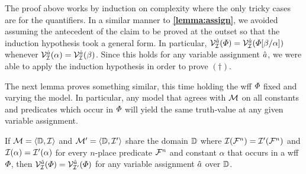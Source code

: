 The proof above works by induction on complexity where the only tricky cases are for the quantifiers.
In a similar manner to \textbf{\ref{lemma:assign}}, we avoided assuming the antecedent of the claim to be proved at the outset so that the induction hypothesis took a general form.
In particular, $\mathcal{V}_{\mathcal{I}}^{\hat{a}}(\varPhi)=\mathcal{V}_{\mathcal{I}}^{\hat{a}}(\varPhi[\beta/\alpha])$ whenever $\mathcal{V}_{\mathcal{I}}^{\hat{a}}(\alpha)=\mathcal{V}_{\mathcal{I}}^{\hat{a}}(\beta)$.
Since this holds for any variable assignment $\hat{a}$, we were able to apply the induction hypothesis in order to prove $(\dagger)$.

The next lemma proves something similar, this time holding the wff $\varPhi$ fixed and varying the model. 
In particular, any model that agrees with $\mathcal{M}$ on all constants and predicates which occur in $\varPhi$ will yield the same truth-value at any given variable assignment. 

\begin{Lthm} \label{lemma:model}
  If $\mathcal{M}=\langle\mathbb{D},\mathcal{I}\rangle$ and $\mathcal{M}'=\langle\mathbb{D},\mathcal{I}'\rangle$ share the domain $\mathbb{D}$ where $\mathcal{I}(\mathcal{F}^n)=\mathcal{I}'(\mathcal{F}^n)$ and $\mathcal{I}(\alpha)=\mathcal{I}'(\alpha)$ for every $n$-place predicate $\mathcal{F}^n$ and constant $\alpha$ that occurs in a wff $\varPhi$, then $\mathcal{V}_{\mathcal{I}}^{\hat{a}}(\varPhi)=\mathcal{V}_{\mathcal{I}'}^{\hat{a}}(\varPhi)$ for any variable assignment $\hat{a}$ over $\mathbb{D}$.
\end{Lthm}

